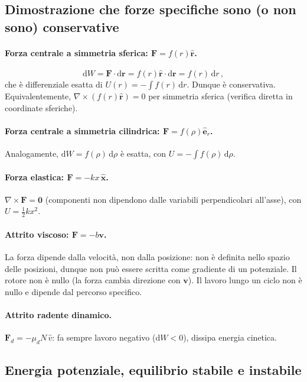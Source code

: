 \documentclass[11pt,a4paper]{article}
\renewcommand{\vec}[1]{\bm{#1}}
\newcommand{\er}{\hat{\bm{e}}_r}
\newcommand{\rhat}{\hat{\bm{r}}}
\theoremstyle{plain}
\theoremstyle{definition}
\theoremstyle{remark}
\begin{document}
\subsection{Dimostrazione che forze specifiche sono (o non sono) conservative}

\paragraph{Forza centrale a simmetria sferica: $\vec{F}=f(r)\rhat$.}
\[
  \mathrm{d}W=\vec{F}\cdot\mathrm{d}\vec{r}=f(r)\rhat\cdot\mathrm{d}\vec{r}=f(r)\,\mathrm{d}r\,,
\]
che è differenziale esatta di $U(r)=-\int f(r)\,\mathrm{d}r$. Dunque è
conservativa. Equivalentemente, $\nabla\times(f(r)\rhat)=0$ per simmetria
sferica (verifica diretta in coordinate sferiche).

\paragraph{Forza centrale a simmetria cilindrica: $\vec{F}=f(\rho)\er$.}
Analogamente, $\mathrm{d}W=f(\rho)\,\mathrm{d}\rho$ è esatta, con
$U=-\int f(\rho)\,\mathrm{d}\rho$.

\paragraph{Forza elastica: $\vec{F}=-kx\,\hat{\bm{x}}$.}
$\nabla\times\vec{F}=\vec{0}$ (componenti non dipendono dalle variabili
perpendicolari all'asse), con $U=\tfrac{1}{2}kx^2$.

\paragraph{Attrito viscoso: $\vec{F}=-b\vec{v}$.}
La forza dipende dalla velocità, non dalla posizione: non è definita nello
spazio delle posizioni, dunque non può essere scritta come gradiente di un
potenziale. Il rotore non è nullo (la forza cambia direzione con $\vec{v}$).
Il lavoro lungo un ciclo non è nullo e dipende dal percorso specifico.

\paragraph{Attrito radente dinamico.}
$\vec{F}_d=-\mu_d N\,\hat{v}$: fa sempre lavoro negativo ($\mathrm{d}W<0$),
dissipa energia cinetica.

\subsection{Energia potenziale, equilibrio stabile e instabile}
\end{document}
